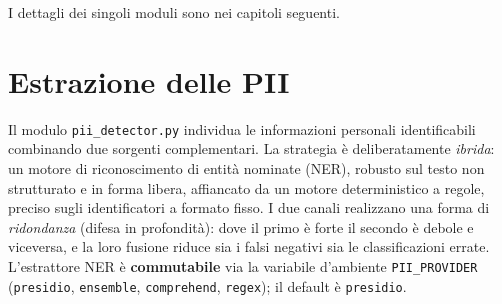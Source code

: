 \documentclass[11pt,a4paper]{article}
\begin{document}
I dettagli dei singoli moduli sono nei capitoli seguenti.

\section{Estrazione delle PII}
Il modulo \texttt{pii\_detector.py} individua le informazioni personali
identificabili combinando due sorgenti complementari. La strategia è deliberatamente
\emph{ibrida}: un motore di riconoscimento di entità nominate (NER), robusto sul
testo non strutturato e in forma libera, affiancato da un motore deterministico a
regole, preciso sugli identificatori a formato fisso. I due canali realizzano una forma
di \emph{ridondanza} (difesa in profondità): dove il primo è forte il secondo è debole e
viceversa, e la loro fusione riduce sia i falsi negativi sia le classificazioni errate.
L'estrattore NER è \textbf{commutabile} via la variabile d'ambiente \texttt{PII\_PROVIDER}
(\texttt{presidio}, \texttt{ensemble}, \texttt{comprehend}, \texttt{regex}); il default è \texttt{presidio}.
\end{document}
